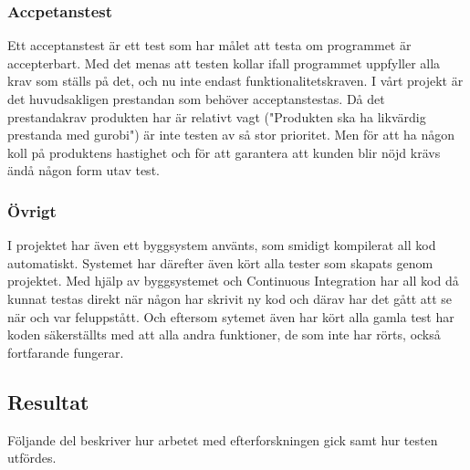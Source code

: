 \subsubsection{Accpetanstest}	
	Ett acceptanstest är ett test som har målet att testa om programmet är accepterbart. Med det menas att testen kollar ifall programmet uppfyller alla krav som ställs på det, och nu inte endast funktionalitetskraven. I vårt projekt är det huvudsakligen prestandan som behöver acceptanstestas. Då det prestandakrav produkten har är relativt vagt ("Produkten ska ha likvärdig prestanda med gurobi") är inte testen av så stor prioritet. Men för att ha någon koll på produktens hastighet och för att garantera att kunden blir nöjd krävs ändå någon form utav test.
\subsubsection{Övrigt}	
	I projektet har även ett byggsystem använts, som smidigt kompilerat all kod automatiskt. Systemet har därefter även kört alla tester som skapats genom projektet.
	Med hjälp av byggsystemet och Continuous Integration har all kod då kunnat testas direkt när någon har skrivit ny kod och därav har det gått att se när och var feluppstått. Och eftersom sytemet även har kört alla gamla test har koden säkerställts med att alla andra funktioner, de som inte har rörts, också fortfarande fungerar.   	
	
	\subsection{Resultat}	
	Följande del beskriver hur arbetet med efterforskningen gick samt hur testen utfördes.
